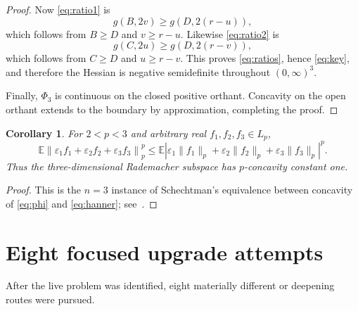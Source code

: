 \documentclass[11pt]{article}
\newtheorem{corollary}{Corollary}
\newcommand{\E}{\mathbb E}
\newcommand{\eps}{\varepsilon}
\begin{document}
\begin{proof}
Now \eqref{eq:ratio1} is
\[
 g(B,2v)\geq g(D,2(r-u)),
\]
which follows from $B\geq D$ and $v\geq r-u$.  Likewise
\eqref{eq:ratio2} is
\[
 g(C,2u)\geq g(D,2(r-v)),
\]
which follows from $C\geq D$ and $u\geq r-v$.  This proves
\eqref{eq:ratios}, hence \eqref{eq:key}, and therefore the Hessian is
negative semidefinite throughout $(0,\infty)^3$.

Finally, $\Phi_3$ is continuous on the closed positive orthant.  Concavity on
the open orthant extends to the boundary by approximation, completing the
proof.
\end{proof}

\begin{corollary}\label{cor:hanner}
For $2<p<3$ and arbitrary real $f_1,f_2,f_3\in L_p$,
\[
 \E\left\|\eps_1f_1+\eps_2f_2+\eps_3f_3\right\|_p^p
 \leq
 \E\left|\eps_1\|f_1\|_p+\eps_2\|f_2\|_p+\eps_3\|f_3\|_p\right|^p.
\]
Thus the three-dimensional Rademacher subspace has $p$-concavity constant
one.
\end{corollary}

\begin{proof}
This is the $n=3$ instance of Schechtman's equivalence between concavity of
\eqref{eq:phi} and \eqref{eq:hanner}; see~\cite{schechtman,jenkins}.
\end{proof}

\section{Eight focused upgrade attempts}

After the live problem was identified, eight materially different or
deepening routes were pursued.
\end{document}
